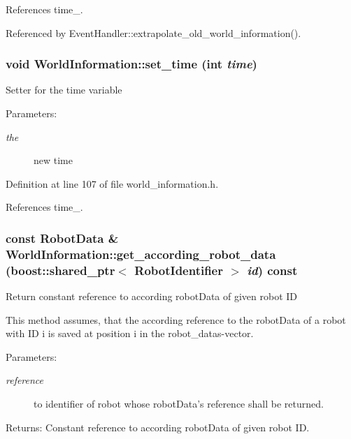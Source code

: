 References time\_\-.

Referenced by EventHandler::extrapolate\_\-old\_\-world\_\-information().\hypertarget{class_world_information_1e733394b8c0c00d6c6f8ffca95a95e2}{
\subsubsection[set\_\-time]{\setlength{\rightskip}{0pt plus 5cm}void WorldInformation::set\_\-time (int {\em time})}}
\label{class_world_information_1e733394b8c0c00d6c6f8ffca95a95e2}


Setter for the time variable \begin{Desc}
\item[Parameters:]
\begin{description}
\item[{\em the}]new time \end{description}
\end{Desc}


Definition at line 107 of file world\_\-information.h.

References time\_\-.\hypertarget{class_world_information_4815e968feab5c7f034bf97cb96a40b8}{
\subsubsection[get\_\-according\_\-robot\_\-data]{\setlength{\rightskip}{0pt plus 5cm}const {\bf RobotData} \& WorldInformation::get\_\-according\_\-robot\_\-data (boost::shared\_\-ptr$<$ {\bf RobotIdentifier} $>$ {\em id}) const}}
\label{class_world_information_4815e968feab5c7f034bf97cb96a40b8}


Return constant reference to according robotData of given robot ID

This method assumes, that the according reference to the robotData of a robot with ID i is saved at position i in the robot\_\-datas-vector.

\begin{Desc}
\item[Parameters:]
\begin{description}
\item[{\em reference}]to identifier of robot whose robotData's reference shall be returned. \end{description}
\end{Desc}
\begin{Desc}
\item[Returns:]Constant reference to according robotData of given robot ID. \end{Desc}


